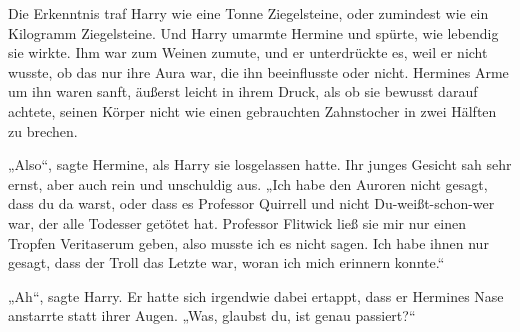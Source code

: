 Die Erkenntnis traf Harry wie eine Tonne Ziegelsteine, oder zumindest wie ein Kilogramm Ziegelsteine.
Und Harry umarmte Hermine und spürte, wie lebendig sie wirkte. Ihm war zum Weinen zumute, und er unterdrückte es, weil er nicht wusste, ob das nur ihre Aura war, die ihn beeinflusste oder nicht.
Hermines Arme um ihn waren sanft, äußerst leicht in ihrem Druck, als ob sie bewusst darauf achtete, seinen Körper nicht wie einen gebrauchten Zahnstocher in zwei Hälften zu brechen.

„Also“, sagte Hermine, als Harry sie losgelassen hatte. Ihr junges Gesicht sah sehr ernst, aber auch rein und unschuldig aus. „Ich habe den Auroren nicht gesagt, dass du da warst, oder dass es Professor Quirrell und nicht Du-weißt-schon-wer war, der alle Todesser getötet hat. Professor Flitwick ließ sie mir nur einen Tropfen Veritaserum geben, also musste ich es nicht sagen. Ich habe ihnen nur gesagt, dass der Troll das Letzte war, woran ich mich erinnern konnte.“

„Ah“, sagte Harry. Er hatte sich irgendwie dabei ertappt, dass er Hermines Nase anstarrte statt ihrer Augen. „Was, glaubst du, ist genau passiert?“

